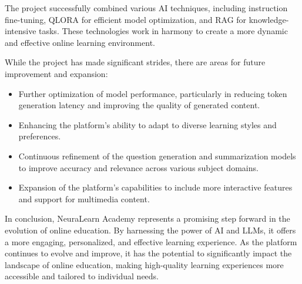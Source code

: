 \newpage
The project successfully combined various AI techniques, including instruction fine-tuning, QLORA for efficient model optimization, and RAG for knowledge-intensive tasks. These technologies work in harmony to create a more dynamic and effective online learning environment.

While the project has made significant strides, there are areas for future improvement and expansion:

\begin{itemize}
    \item Further optimization of model performance, particularly in reducing token generation latency and improving the quality of generated content.
    
    \item Enhancing the platform's ability to adapt to diverse learning styles and preferences.
    
    \item Continuous refinement of the question generation and summarization models to improve accuracy and relevance across various subject domains.
    
    \item Expansion of the platform's capabilities to include more interactive features and support for multimedia content.
\end{itemize}

In conclusion, NeuraLearn Academy represents a promising step forward in the evolution of online education. By harnessing the power of AI and LLMs, it offers a more engaging, personalized, and effective learning experience. As the platform continues to evolve and improve, it has the potential to significantly impact the landscape of online education, making high-quality learning experiences more accessible and tailored to individual needs.